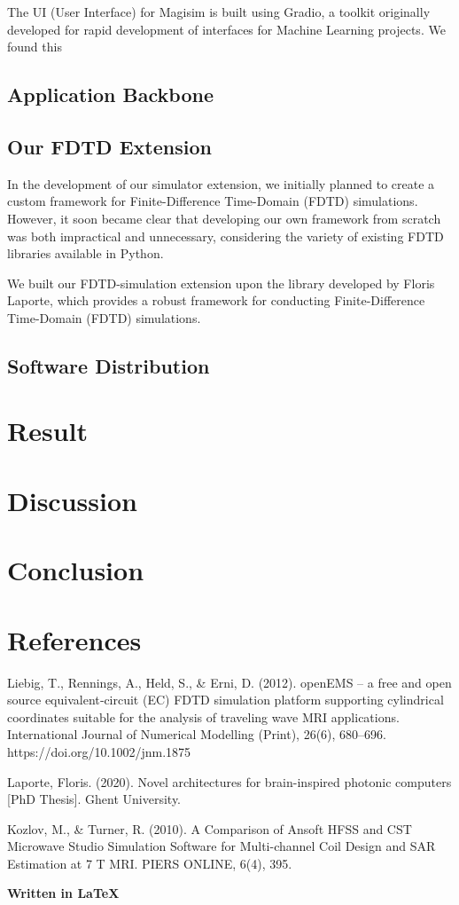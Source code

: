 \documentclass[11pt, a4paper, titlepage]{article}
\begin{document}
The UI (User Interface) for Magisim is built using Gradio, a toolkit originally developed for rapid development of interfaces for Machine Learning projects. We found this 


\subsection{Application Backbone}




\subsection{Our FDTD Extension}
In the development of our simulator extension, we initially planned to create a custom framework for Finite-Difference Time-Domain (FDTD) simulations. However, it soon became clear that developing our own framework from scratch was both impractical and unnecessary, considering the variety of existing FDTD libraries available in Python.

We built our FDTD-simulation extension upon the library developed by Floris Laporte, which provides a robust framework for conducting Finite-Difference Time-Domain (FDTD) simulations.

\subsection{Software Distribution}


\newpage
\section{Result}
\newpage
\section{Discussion}
\newpage
\section{Conclusion}
\newpage
\section{References}
Liebig, T., Rennings, A., Held, S., \& Erni, D. (2012). openEMS – a free and open source equivalent‐circuit (EC) FDTD simulation platform supporting cylindrical coordinates suitable for the analysis of traveling wave MRI applications. International Journal of Numerical Modelling (Print), 26(6), 680–696. https://doi.org/10.1002/jnm.1875

Laporte, Floris. (2020). Novel architectures for brain-inspired photonic computers [PhD Thesis]. Ghent University.

Kozlov, M., \& Turner, R. (2010). A Comparison of Ansoft HFSS and CST Microwave Studio Simulation Software for Multi-channel Coil Design and SAR Estimation at 7 T MRI. PIERS ONLINE, 6(4), 395.



\newpage
\newpage
{} 
\printbibliography




\begin{center}
	\large\textbf{Written in \LaTeX}
\end{center}
\end{document}
